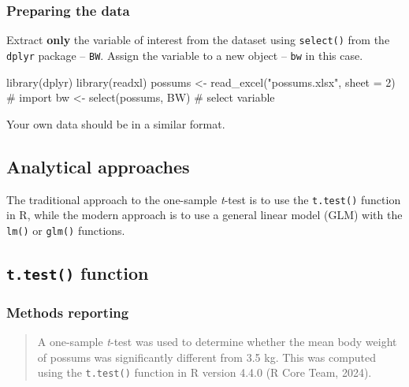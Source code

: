 \documentclass[
  letterpaper,
  DIV=11,
  numbers=noendperiod]{scrartcl}
\newenvironment{Shaded}{\begin{snugshade}}{\end{snugshade}}
\newcommand{\AttributeTok}[1]{\textcolor[rgb]{0.40,0.45,0.13}{#1}}
\newcommand{\CommentTok}[1]{\textcolor[rgb]{0.37,0.37,0.37}{#1}}
\newcommand{\DecValTok}[1]{\textcolor[rgb]{0.68,0.00,0.00}{#1}}
\newcommand{\FunctionTok}[1]{\textcolor[rgb]{0.28,0.35,0.67}{#1}}
\newcommand{\NormalTok}[1]{\textcolor[rgb]{0.00,0.23,0.31}{#1}}
\newcommand{\OtherTok}[1]{\textcolor[rgb]{0.00,0.23,0.31}{#1}}
\newcommand{\StringTok}[1]{\textcolor[rgb]{0.13,0.47,0.30}{#1}}
\begin{document}
\subsubsection{Preparing the data}\label{preparing-the-data}

Extract \textbf{only} the variable of interest from the dataset using
\texttt{select()} from the \texttt{dplyr} package -- \texttt{BW}. Assign
the variable to a new object -- \texttt{bw} in this case.

\begin{Shaded}
\begin{Highlighting}[]
\FunctionTok{library}\NormalTok{(dplyr)}
\FunctionTok{library}\NormalTok{(readxl)}
\NormalTok{possums }\OtherTok{\textless{}{-}} \FunctionTok{read\_excel}\NormalTok{(}\StringTok{"possums.xlsx"}\NormalTok{, }\AttributeTok{sheet =} \DecValTok{2}\NormalTok{) }\CommentTok{\# import}
\NormalTok{bw }\OtherTok{\textless{}{-}} \FunctionTok{select}\NormalTok{(possums, BW) }\CommentTok{\# select variable}
\end{Highlighting}
\end{Shaded}

Your own data should be in a similar format.

\subsection{Analytical approaches}\label{analytical-approaches}

The traditional approach to the one-sample \emph{t}-test is to use the
\texttt{t.test()} function in R, while the modern approach is to use a
general linear model (GLM) with the \texttt{lm()} or \texttt{glm()}
functions.

\subsection{\texorpdfstring{\texttt{t.test()}
function}{t.test() function}}

\subsubsection{Methods reporting}\label{methods-reporting}

\begin{quote}
A one-sample \emph{t}-test was used to determine whether the mean body
weight of possums was significantly different from 3.5 kg. This was
computed using the \texttt{t.test()} function in R version 4.4.0 (R Core
Team, 2024).
\end{quote}
\end{document}

